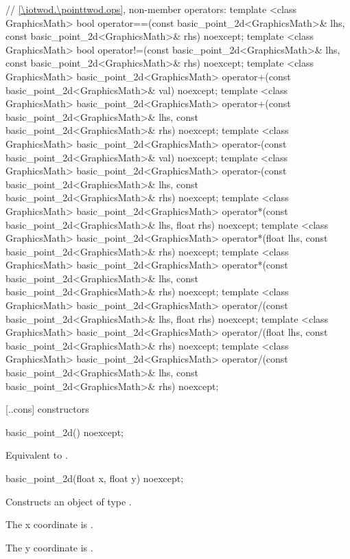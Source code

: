 \begin{codeblock}
{  // \ref{\iotwod.\pointtwod.ops}, non-member operators:
  template <class GraphicsMath>
  bool operator==(const basic_point_2d<GraphicsMath>& lhs,
    const basic_point_2d<GraphicsMath>& rhs) noexcept;
  template <class GraphicsMath>
  bool operator!=(const basic_point_2d<GraphicsMath>& lhs,
    const basic_point_2d<GraphicsMath>& rhs) noexcept;
  template <class GraphicsMath>
  basic_point_2d<GraphicsMath> operator+(const basic_point_2d<GraphicsMath>& val) noexcept;
  template <class GraphicsMath>
  basic_point_2d<GraphicsMath> operator+(const basic_point_2d<GraphicsMath>& lhs,
    const basic_point_2d<GraphicsMath>& rhs) noexcept;
  template <class GraphicsMath>
  basic_point_2d<GraphicsMath> operator-(const basic_point_2d<GraphicsMath>& val) noexcept;
  template <class GraphicsMath>
  basic_point_2d<GraphicsMath> operator-(const basic_point_2d<GraphicsMath>& lhs,
    const basic_point_2d<GraphicsMath>& rhs) noexcept;
  template <class GraphicsMath>
  basic_point_2d<GraphicsMath> operator*(const basic_point_2d<GraphicsMath>& lhs,
    float rhs) noexcept;
  template <class GraphicsMath>
  basic_point_2d<GraphicsMath> operator*(float lhs,
    const basic_point_2d<GraphicsMath>& rhs) noexcept;
  template <class GraphicsMath>
  basic_point_2d<GraphicsMath> operator*(const basic_point_2d<GraphicsMath>& lhs,
    const basic_point_2d<GraphicsMath>& rhs) noexcept;
  template <class GraphicsMath>
  basic_point_2d<GraphicsMath> operator/(const basic_point_2d<GraphicsMath>& lhs,
    float rhs) noexcept;
  template <class GraphicsMath>
  basic_point_2d<GraphicsMath> operator/(float lhs,
    const basic_point_2d<GraphicsMath>& rhs) noexcept;
  template <class GraphicsMath>
  basic_point_2d<GraphicsMath> operator/(const basic_point_2d<GraphicsMath>& lhs,
    const basic_point_2d<GraphicsMath>& rhs) noexcept;
}
\end{codeblock}

 [\iotwod.\pointtwod.cons] { constructors}

%
\begin{itemdecl}
basic_point_2d() noexcept;
\end{itemdecl}
\begin{itemdescr}
\pnum
\effects
Equivalent to .
\end{itemdescr}

%
\begin{itemdecl}
basic_point_2d(float x, float y) noexcept;
\end{itemdecl}
\begin{itemdescr}
\pnum
\effects
Constructs an object of type .

\pnum
The x coordinate is .

\pnum
The y coordinate is .
\end{itemdescr}


